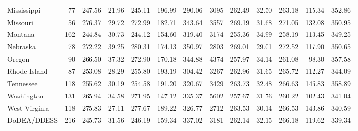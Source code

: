 \begin{sidewaystable}[ht]
\begin{tabular}{lrrrrrr@{\extracolsep{10pt}}rrrrrr}
  Mississippi &  77 & 247.56 & 21.96 & 245.11 & 196.99 & 290.06 & 3095 & 262.49 & 32.50 & 263.18 & 115.34 & 352.86 \\ 
  Missouri &  56 & 276.37 & 29.72 & 272.99 & 182.71 & 343.64 & 3557 & 269.19 & 31.68 & 271.05 & 132.08 & 350.95 \\ 
  Montana & 162 & 244.84 & 30.73 & 244.12 & 154.60 & 319.40 & 3174 & 255.36 & 34.99 & 258.19 & 113.45 & 349.25 \\ 
  Nebraska &  78 & 272.22 & 39.25 & 280.31 & 174.13 & 350.97 & 2803 & 269.01 & 29.01 & 272.52 & 117.90 & 350.65 \\ 
  Oregon &  90 & 266.50 & 37.32 & 272.90 & 170.18 & 344.88 & 4374 & 257.97 & 34.14 & 261.08 & 98.30 & 357.58 \\ 
  Rhode Island &  87 & 253.08 & 28.29 & 255.80 & 193.19 & 304.42 & 3267 & 262.96 & 31.65 & 265.72 & 112.27 & 344.09 \\ 
  Tennessee & 118 & 255.62 & 30.19 & 254.58 & 191.20 & 320.67 & 3429 & 263.73 & 32.48 & 266.63 & 145.83 & 358.89 \\ 
  Washington & 131 & 265.94 & 34.58 & 271.95 & 147.12 & 335.37 & 5602 & 257.67 & 31.76 & 260.22 & 102.43 & 341.04 \\ 
  West Virginia & 118 & 275.83 & 27.11 & 277.67 & 189.22 & 326.77 & 2712 & 263.53 & 30.14 & 266.53 & 143.86 & 340.59 \\ 
  DoDEA/DDESS & 216 & 245.73 & 31.56 & 246.19 & 159.34 & 337.02 & 3181 & 262.14 & 32.15 & 266.18 & 119.62 & 339.34 \\ 
   \hline
\end{tabular}
\end{sidewaystable}
